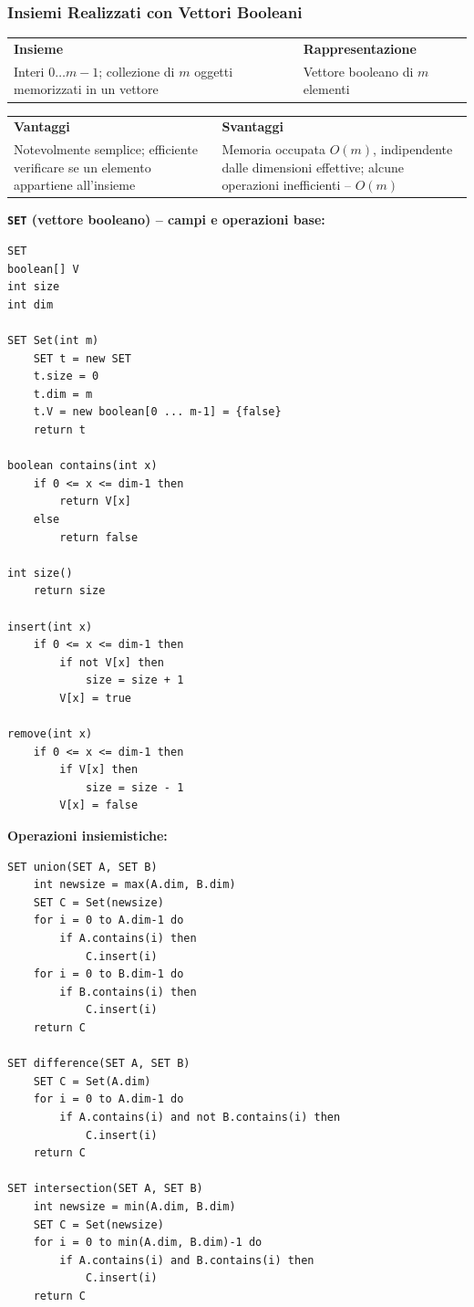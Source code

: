 \documentclass[12pt, a4paper]{article}
\begin{document}
\subsubsection{Insiemi Realizzati con Vettori Booleani}

\begin{center}
\begin{tabular}{p{5.5cm}p{5.5cm}}
\textbf{Insieme} & \textbf{Rappresentazione} \\
Interi $0\ldots m-1$; collezione di $m$ oggetti memorizzati in un vettore & Vettore booleano di $m$ elementi \\
\end{tabular}
\end{center}

\begin{center}
\begin{tabular}{p{5.5cm}p{5.5cm}}
\textbf{Vantaggi} & \textbf{Svantaggi} \\
Notevolmente semplice; efficiente verificare se un elemento appartiene all'insieme & Memoria occupata $O(m)$, indipendente dalle dimensioni effettive; alcune operazioni inefficienti -- $O(m)$ \\
\end{tabular}
\end{center}

\textbf{\texttt{SET} (vettore booleano) -- campi e operazioni base:}
\begin{verbatim}
SET
boolean[] V
int size
int dim

SET Set(int m)
    SET t = new SET
    t.size = 0
    t.dim = m
    t.V = new boolean[0 ... m-1] = {false}
    return t

boolean contains(int x)
    if 0 <= x <= dim-1 then
        return V[x]
    else
        return false

int size()
    return size

insert(int x)
    if 0 <= x <= dim-1 then
        if not V[x] then
            size = size + 1
        V[x] = true

remove(int x)
    if 0 <= x <= dim-1 then
        if V[x] then
            size = size - 1
        V[x] = false
\end{verbatim}

\textbf{Operazioni insiemistiche:}
\begin{verbatim}
SET union(SET A, SET B)
    int newsize = max(A.dim, B.dim)
    SET C = Set(newsize)
    for i = 0 to A.dim-1 do
        if A.contains(i) then
            C.insert(i)
    for i = 0 to B.dim-1 do
        if B.contains(i) then
            C.insert(i)
    return C

SET difference(SET A, SET B)
    SET C = Set(A.dim)
    for i = 0 to A.dim-1 do
        if A.contains(i) and not B.contains(i) then
            C.insert(i)
    return C

SET intersection(SET A, SET B)
    int newsize = min(A.dim, B.dim)
    SET C = Set(newsize)
    for i = 0 to min(A.dim, B.dim)-1 do
        if A.contains(i) and B.contains(i) then
            C.insert(i)
    return C
\end{verbatim}
\end{document}
